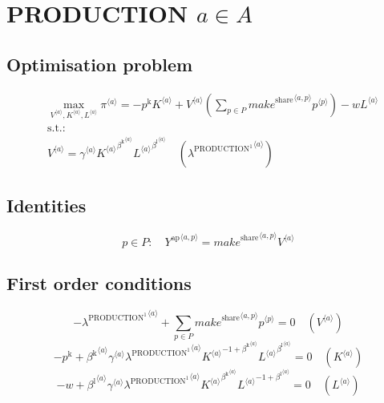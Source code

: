 \section{PRODUCTION $a\in A$}

\subsection{Optimisation problem}

\begin{align}
&\max_{{V}^{\langle a\rangle}, {K}^{\langle a\rangle}, {L}^{\langle a\rangle}
} {\pi}^{\langle a\rangle} = -{p^{\mathrm{k}}} {{K}^{\langle a\rangle}} + {{V}^{\langle a\rangle}} \left(\sum_{p\in P} {{{m\!a\!k\!e}^{\mathrm{share}}}^{\langle a,p\rangle}} {{p}^{\langle p\rangle}}\right) - {w} {{L}^{\langle a\rangle}}\\
&\mathrm{s.t.:}\nonumber\\
& {V}^{\langle a\rangle} = {{\gamma}^{\langle a\rangle}} {{{K}^{\langle a\rangle}}^{{\beta^{\mathrm{k}}}^{\langle a\rangle}}} {{{L}^{\langle a\rangle}}^{{\beta^{\mathrm{l}}}^{\langle a\rangle}}} \quad \left({\lambda^{\mathrm{PRODUCTION}^{\mathrm{1}}}}^{\langle a\rangle}\right)
\end{align}


\subsection{Identities}

\begin{equation}
p\in P\colon\quad {Y^{\mathrm{ap}}}^{\langle a,p\rangle} = {{{m\!a\!k\!e}^{\mathrm{share}}}^{\langle a,p\rangle}} {{V}^{\langle a\rangle}}
\end{equation}


\subsection{First order conditions}

\begin{equation}
-{\lambda^{\mathrm{PRODUCTION}^{\mathrm{1}}}}^{\langle a\rangle} + \sum_{p\in P} {{{m\!a\!k\!e}^{\mathrm{share}}}^{\langle a,p\rangle}} {{p}^{\langle p\rangle}} = 0
 \quad \left({V}^{\langle a\rangle}\right)
\end{equation}
\begin{equation}
-p^{\mathrm{k}} + {{\beta^{\mathrm{k}}}^{\langle a\rangle}} {{\gamma}^{\langle a\rangle}} {{\lambda^{\mathrm{PRODUCTION}^{\mathrm{1}}}}^{\langle a\rangle}} {{{K}^{\langle a\rangle}}^{-1 + {\beta^{\mathrm{k}}}^{\langle a\rangle}}} {{{L}^{\langle a\rangle}}^{{\beta^{\mathrm{l}}}^{\langle a\rangle}}} = 0
 \quad \left({K}^{\langle a\rangle}\right)
\end{equation}
\begin{equation}
-w + {{\beta^{\mathrm{l}}}^{\langle a\rangle}} {{\gamma}^{\langle a\rangle}} {{\lambda^{\mathrm{PRODUCTION}^{\mathrm{1}}}}^{\langle a\rangle}} {{{K}^{\langle a\rangle}}^{{\beta^{\mathrm{k}}}^{\langle a\rangle}}} {{{L}^{\langle a\rangle}}^{-1 + {\beta^{\mathrm{l}}}^{\langle a\rangle}}} = 0
 \quad \left({L}^{\langle a\rangle}\right)
\end{equation}


